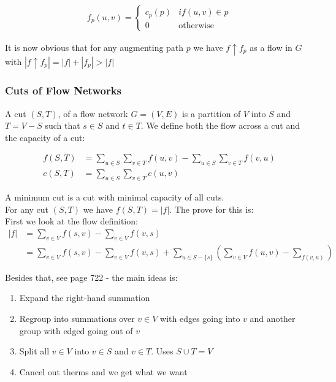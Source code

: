 \begin{align}
 f_p(u, v) =
  \begin{cases}
  	c_p(p) & if (u, v) \in p \\
  	0 & \text{otherwise}
  \end{cases}
\end{align}

It is now obvious that for any augmenting path $p$ we have $f \uparrow f_p$ as a flow in $G$ with $|f \uparrow f_p| = |f| + |f_p| > |f|$
%
\subsubsection{Cuts of Flow Networks}
A cut $(S, T)$, of a flow network $G = (V, E)$ is a partition of $V$ into $S$ and $T = V - S$ such that $s \in S$ and $t \in T$. We define both the flow across a cut and the capacity of a cut:

\begin{align}
f(S, T) &= \sum_{u \in S} \sum_{v \in T} f(u, v) - \sum_{u \in S} \sum_{v \in T} f(v, u)\\
c(S, T) &= \sum_{u \in S} \sum_{v \in T} c(u, v)
\end{align}

A minimum cut is a cut with minimal capacity of all cuts. \\
For any cut $(S, T)$ we have $f(S, T) = |f|$. The prove for this is:\\

First we look at the flow definition:
\begin{align*}
|f| &= \sum_{v \in V} f(s, v) - \sum_{v \in V} f(v, s)\\
&= \sum_{v \in V} f(s, v) - \sum_{v \in V} f(v, s) + \sum_{u \in S - \{s\}} \left ( \sum_{v \in V} f(u, v) - \sum_{f(v, u)}\right)
\end{align*}

Besides that, see page 722 - the main ideas is: 

\begin{enumerate}
	\item Expand the right-hand summation 
	\item Regroup into summations over $v \in V$ with edges going into $v$ and another group with edged going out of $v$
	\item Split all $v \in V$ into $v \in S$ and $v \in T$. Uses $S \cup T = V$
	\item Cancel out therms and we get what we want
\end{enumerate}

